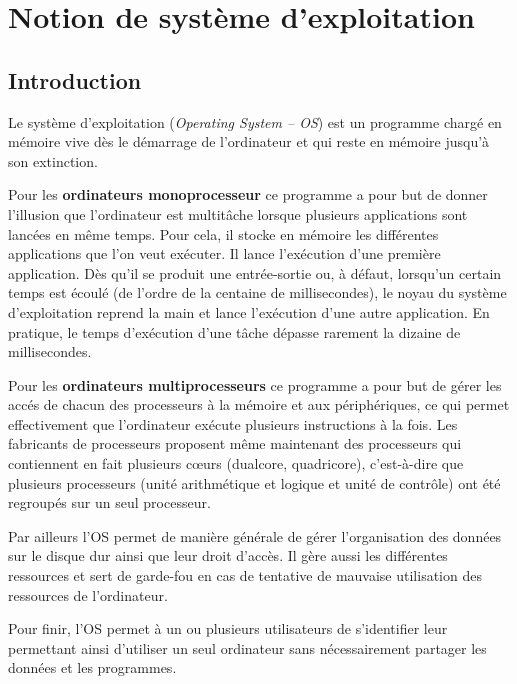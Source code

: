 \documentclass[10pt,fleqn]{article} %
\begin{document}




\section{Notion de système d'exploitation}

\subsection{Introduction}

Le système d'exploitation (\textit{Operating System -- OS}) est un programme chargé en mémoire vive dès le démarrage de l'ordinateur et qui reste en mémoire jusqu'à son extinction. 

Pour les \textbf{ordinateurs monoprocesseur} ce programme a pour but de donner l’illusion que l’ordinateur est multitâche lorsque plusieurs applications sont lancées en même temps. Pour cela, il stocke en mémoire les différentes applications que l’on veut exécuter. Il lance l’exécution d’une première application. Dès qu’il se produit une entrée-sortie ou, à défaut, lorsqu’un certain temps est écoulé (de l’ordre de la centaine de millisecondes), le noyau du système d’exploitation reprend la main et lance l’exécution d’une autre application. En pratique, le temps d’exécution d’une tâche dépasse rarement la dizaine de millisecondes.

Pour les \textbf{ordinateurs multiprocesseurs} ce programme a pour but de gérer les accés de chacun des processeurs à la mémoire et aux périphériques, ce qui permet
effectivement que l’ordinateur exécute plusieurs instructions à la fois. Les fabricants
de processeurs proposent même maintenant des processeurs qui contiennent en fait plusieurs
c\oe{}urs (dualcore, quadricore), c’est-à-dire que plusieurs processeurs (unité arithmétique
et logique et unité de contrôle) ont été regroupés sur un seul processeur.

Par ailleurs l'OS permet de manière générale de gérer l'organisation des données sur le disque dur ainsi que leur droit d'accès. Il gère aussi les différentes ressources et sert de garde-fou en cas de tentative de mauvaise utilisation des ressources de l'ordinateur.

Pour finir, l'OS permet à un ou plusieurs utilisateurs de s'identifier leur permettant ainsi d'utiliser un seul ordinateur sans nécessairement partager les données et les programmes. 
\end{document}
